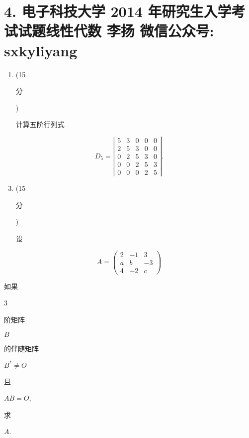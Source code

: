 \documentclass[10pt]{article}
\begin{document}
\section{4. 电子科技大学 2014 年研究生入学考试试题线性代数 
 李扬 
 微信公众号: sxkyliyang}
\begin{enumerate}
  \item (15 \begin{CJK}{UTF8}{mj}分\end{CJK}) \begin{CJK}{UTF8}{mj}计算五阶行列式\end{CJK}
\end{enumerate}
$$
D_{5}=\left|\begin{array}{lllll}
5 & 3 & 0 & 0 & 0 \\
2 & 5 & 3 & 0 & 0 \\
0 & 2 & 5 & 3 & 0 \\
0 & 0 & 2 & 5 & 3 \\
0 & 0 & 0 & 2 & 5
\end{array}\right| .
$$

\begin{enumerate}
  \setcounter{enumi}{2}
  \item (15 \begin{CJK}{UTF8}{mj}分\end{CJK}) \begin{CJK}{UTF8}{mj}设\end{CJK}
\end{enumerate}
$$
A=\left(\begin{array}{ccc}
2 & -1 & 3 \\
a & b & -3 \\
4 & -2 & c
\end{array}\right)
$$
\begin{CJK}{UTF8}{mj}如果\end{CJK} 3 \begin{CJK}{UTF8}{mj}阶矩阵\end{CJK} $B$ \begin{CJK}{UTF8}{mj}的伴随矩阵\end{CJK} $B^{*} \neq O$ \begin{CJK}{UTF8}{mj}且\end{CJK} $A B=O$, \begin{CJK}{UTF8}{mj}求\end{CJK} $A$.
\end{document}

